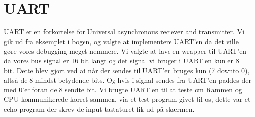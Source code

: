 \section{UART}
UART er en forkortelse for Universal asynchronous reciever and transmitter. Vi gik ud fra eksemplet i bogen, og valgte at implementere UART'en da det ville gøre vores debugging meget nemmere.  Vi valgte at lave en wrapper til UART'en da vores bus signal er 16 bit langt og det signal vi bruger i UART'en kun er 8 bit. Dette blev gjort ved at når der sendes til UART'en bruges kun (7 downto 0), altså de 8 mindst betydende bits. Og hvis i signal sendes fra UART'en paddes der med 0'er foran de 8 sendte bit. %
Vi brugte UART'en til at teste om Rammen og CPU kommunikerede korret sammen, via et test program givet til os, dette var et echo program der skrev de input tastaturet fik ud på skærmen.
